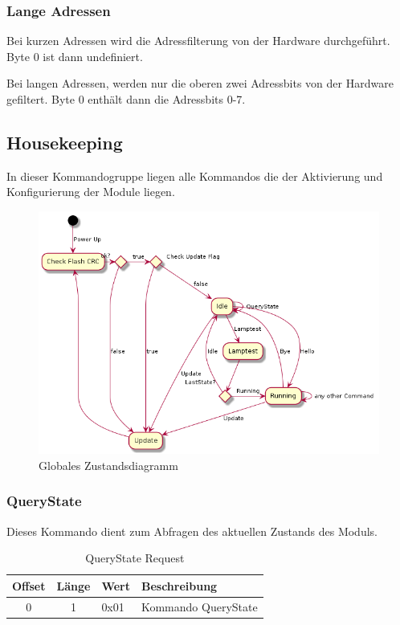 \documentclass[10pt,a4paper]{article}
\begin{document}
\subsubsection{Lange Adressen}
Bei kurzen Adressen wird die Adressfilterung von der Hardware durchgeführt. Byte 0 ist dann undefiniert. 

Bei langen Adressen, werden nur die oberen zwei Adressbits von der Hardware gefiltert. Byte 0 enthält dann die Adressbits 0-7.

\subsection{Housekeeping}
\label{sec:Housekeeping}
In dieser Kommandogruppe liegen alle Kommandos die der Aktivierung und Konfigurierung der Module liegen. 
\begin{figure}[H]
\centering
\includegraphics[scale=0.5]{global_activity.png}
\caption{Globales Zustandsdiagramm}
\end{figure}

\subsubsection{QueryState}
\label{sec:QueryState}
Dieses Kommando dient zum Abfragen des aktuellen Zustands des Moduls.
\begin{table}[H]
\centering
\begin{tabular}{c|c|l|l}
\textbf{Offset} & \textbf{Länge} & \textbf{Wert} & \textbf{Beschreibung} \\ \hline
0 & 1 & 0x01 & Kommando QueryState 
\end{tabular}
\caption{QueryState Request}
\end{table}
\end{document}
